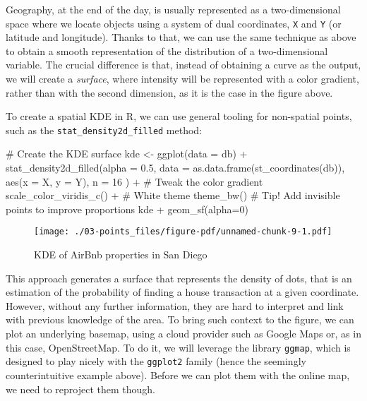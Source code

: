 \documentclass[
  letterpaper,
  krantz2]{style/krantz}
\newenvironment{Shaded}{\begin{snugshade}}{\end{snugshade}}
\newcommand{\AttributeTok}[1]{\textcolor[rgb]{0.40,0.45,0.13}{#1}}
\newcommand{\CommentTok}[1]{\textcolor[rgb]{0.37,0.37,0.37}{#1}}
\newcommand{\DecValTok}[1]{\textcolor[rgb]{0.68,0.00,0.00}{#1}}
\newcommand{\FloatTok}[1]{\textcolor[rgb]{0.68,0.00,0.00}{#1}}
\newcommand{\FunctionTok}[1]{\textcolor[rgb]{0.28,0.35,0.67}{#1}}
\newcommand{\NormalTok}[1]{\textcolor[rgb]{0.00,0.23,0.31}{#1}}
\newcommand{\OtherTok}[1]{\textcolor[rgb]{0.00,0.23,0.31}{#1}}
\newcommand{\SpecialCharTok}[1]{\textcolor[rgb]{0.37,0.37,0.37}{#1}}
\begin{document}
Geography, at the end of the day, is usually represented as a
two-dimensional space where we locate objects using a system of dual
coordinates, \texttt{X} and \texttt{Y} (or latitude and longitude).
Thanks to that, we can use the same technique as above to obtain a
smooth representation of the distribution of a two-dimensional variable.
The crucial difference is that, instead of obtaining a curve as the
output, we will create a \emph{surface}, where intensity will be
represented with a color gradient, rather than with the second
dimension, as it is the case in the figure above.

To create a spatial KDE in R, we can use general tooling for non-spatial
points, such as the \texttt{stat\_density2d\_filled} method:

\begin{Shaded}
\begin{Highlighting}[]
\CommentTok{\# Create the KDE surface}
\NormalTok{kde }\OtherTok{\textless{}{-}} \FunctionTok{ggplot}\NormalTok{(}\AttributeTok{data =}\NormalTok{ db) }\SpecialCharTok{+}
  \FunctionTok{stat\_density2d\_filled}\NormalTok{(}\AttributeTok{alpha =} \FloatTok{0.5}\NormalTok{,}
    \AttributeTok{data =} \FunctionTok{as.data.frame}\NormalTok{(}\FunctionTok{st\_coordinates}\NormalTok{(db)), }
    \FunctionTok{aes}\NormalTok{(}\AttributeTok{x =}\NormalTok{ X, }\AttributeTok{y =}\NormalTok{ Y),}
    \AttributeTok{n =} \DecValTok{16}
\NormalTok{  ) }\SpecialCharTok{+}
  \CommentTok{\# Tweak the color gradient}
  \FunctionTok{scale\_color\_viridis\_c}\NormalTok{() }\SpecialCharTok{+}
  \CommentTok{\# White theme}
  \FunctionTok{theme\_bw}\NormalTok{()}
\CommentTok{\# Tip! Add invisible points to improve proportions}
\NormalTok{kde }\SpecialCharTok{+} \FunctionTok{geom\_sf}\NormalTok{(}\AttributeTok{alpha=}\DecValTok{0}\NormalTok{)}
\end{Highlighting}
\end{Shaded}

\begin{figure}[H]

{\centering \texttt{[image: ./03-points\_files/figure-pdf/unnamed-chunk-9-1.pdf]}

}

\caption{KDE of AirBnb properties in San Diego}

\end{figure}

This approach generates a surface that represents the density of dots,
that is an estimation of the probability of finding a house transaction
at a given coordinate. However, without any further information, they
are hard to interpret and link with previous knowledge of the area. To
bring such context to the figure, we can plot an underlying basemap,
using a cloud provider such as Google Maps or, as in this case,
OpenStreetMap. To do it, we will leverage the library \texttt{ggmap},
which is designed to play nicely with the \texttt{ggplot2} family (hence
the seemingly counterintuitive example above). Before we can plot them
with the online map, we need to reproject them though.
\end{document}
